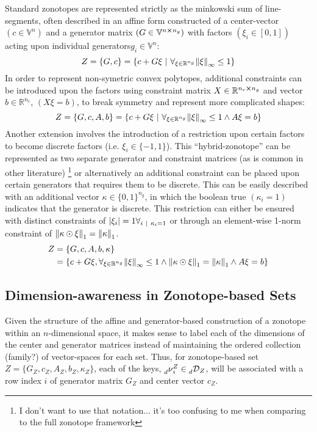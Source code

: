 \documentclass[11pt]{article}
\newcommand{\R}{\mathbb{R}} %
\newcommand{\st}{ \ | \ }
\newcommand{\V}{\mathbb{V}} %
\newcommand{\Key}{\nu} %
\newcommand{\Dict}{\mathcal{D}} %
\newcommand{\dimKey}{\prescript{}{d}{\Key}} %
\newcommand{\dimDict}{\prescript{}{d}{\Dict}} %
\newcommand{\dSet}{\kappa} %
\begin{document}
Standard zonotopes are represented strictly as the minkowski sum of line-segments, often described in an affine form constructed of a center-vector $(c \in \V^{n})$ and a generator matrix $(G \in \V^{n\cross n_g})$ with factors $(\xi_{i} \in [0,1])$ acting upon individual generators$g_{i} \in \V^{n}$:\[
	Z = \qty{G, c} = \qty{c + G \xi \st \forall_{\xi \in \R^{n_g}} \norm{\xi}_{\infty} \leq 1}
\]
In order to represent non-symetric convex polytopes, additional constraints can be introduced upon the factors using constraint matrix $X \in \R^{n_c \cross n_g}$ and vector $b \in \R^{n_c}$, $(X \xi = b)$, to break symmetry and represent more complicated shapes:\[
	Z = \qty{G, c, A, b} = \qty{c + G \xi \st \forall_{\xi \in \R^{n_g}} \norm{\xi}_{\infty} \leq 1 \land A \xi = b}
\]
Another extension involves the introduction of a restriction upon certain factors to become discrete factors (i.e. $\xi_{i} \in \{-1,1\}$).
This ``hybrid-zonotope'' can be represented as two separate generator and constraint matrices (as is common in other literature)
\footnote{I don't want to use that notation... it's too confusing to me when comparing to the full zonotope framework}
or alternatively an additional constraint can be placed upon certain generators that requires them to be discrete.
This can be easily described with an additional vector $\dSet \in \{0,1\}^{n_g}$, in which the boolean true $(\dSet_{i} = 1)$ indicates that the generator is discrete.
This restriction can either be ensured with distinct constraints of $\abs{\xi_{i}} = 1 \forall_{i \st \dSet_{i} = 1}$ or through an element-wise 1-norm constraint of $\norm{\dSet \odot \xi}_{1} = \norm{\dSet}_{1}$. \[
\begin{aligned}
	Z &= \{G,c,A,b,\dSet\} \\
		&= \qty{c + G \xi,  \forall_{\xi \in \R^{n_g}} \norm{\xi}_\infty \leq 1 \land \norm{\dSet \odot \xi}_{1} = \norm{\dSet}_{1} \land A\xi = b}
\end{aligned}
\]

\subsection{Dimension-awareness in Zonotope-based Sets}
Given the structure of the affine and generator-based construction of a zonotope within an $n$-dimensional space, it makes sense to label each of the dimensions of the center and generator matrices instead of maintaining the ordered collection (family?) of vector-spaces for each set.
Thus, for zonotope-based set $Z = \{G_{Z},c_{Z},A_{Z},b_{Z},\dSet_{Z}\}$, each of the keys, $\dimKey^{Z}_{i} \in \dimDict_{Z}$, will be associated with a row index $i$ of generator matrix $G_{Z}$ and center vector $c_{Z}$.
\end{document}
